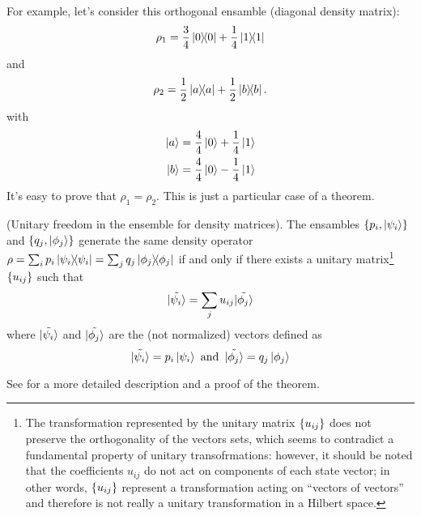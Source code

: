 For example, let's consider this orthogonal ensamble (diagonal density matrix):
\[
  \rho_1 = \frac{3}{4}\ketbra{0}{0} + \frac{1}{4}\ketbra{1}{1}
\]
and
\[
  \rho_2 = \frac{1}{2}\ketbra{a}{a} + \frac{1}{2}\ketbra{b}{b}\text{.}
\]
with
\begin{align*}
  \ket{a} &= \frac{4}{4}\ket{0} + \frac{1}{4}\ket{1} \\
  \ket{b} &= \frac{4}{4}\ket{0} - \frac{1}{4}\ket{1}
\end{align*}
It's easy to prove that $\rho_1 = \rho_2$. This is just a particular
case of a theorem.
\begin{theorem}{(Unitary freedom in the ensemble for density matrices).}
  The ensambles
  $\left\{p_i, \ket{\psi_i}\right\}$ and $\left\{q_{j}, \ket{\phi_j}\right\}$
  generate the same density operator
  $\rho = \sum_i p_i \ketbra{\psi_i} = \sum_j q_j \ketbra{\phi_j}$
  if and only if there exists
  a unitary matrix\footnote{
    The transformation represented by the unitary matrix $\left\{u_{ij}\right\}$
    does not preserve the orthogonality of the vectors sets,
    which seems to contradict a fundamental property of unitary
    transofrmations: however, it should be noted that the coefficients
    $u_{ij}$ do not act on components of each state vector; in other
    words, $\left\{u_{ij}\right\}$ represent a transformation acting
    on ``vectors of vectors'' and therefore is not really a unitary
    transformation in a Hilbert space.
  }
  $\left\{u_{ij}\right\}$ such that
  \[
    \tilde{\ket{\psi_i}} = \sum_j u_{ij}\tilde{\ket{\phi_j}}
  \]
  where $\tilde{\ket{\psi_i}}$ and $\tilde{\ket{\phi_j}}$
  are the (not normalized) vectors defined as
  \[
    \tilde{\ket{\psi_i}} = p_{i}\ket{\psi_i}
    \text{ and }\,
    \tilde{\ket{\phi_j}} = q_{j}\ket{\phi_j}
  \]
\end{theorem}
See \cite[Theorem 2.6 and introductory example]{NielsenChuang}
for a more detailed description and a proof of the theorem.
